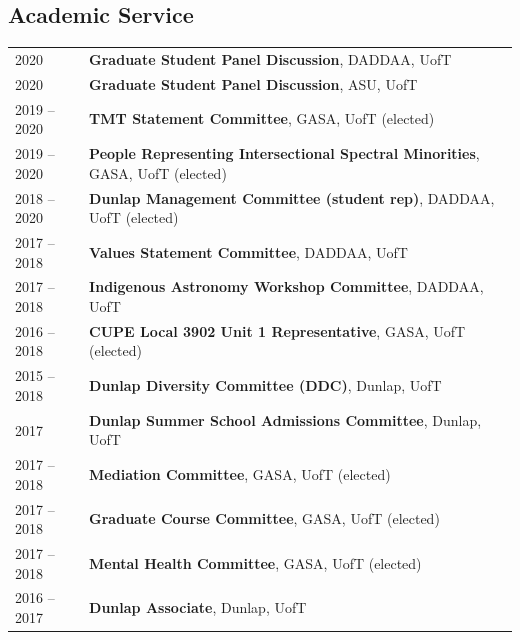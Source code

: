 \documentclass[10pt]{res} %
\begin{document}
\begin{resume}
\newpage
\section{\Large Academic Service}
\vspace{-5pt} %
\noindent\makebox[\linewidth]{\rule{\textwidth}{0.4pt}}
\vspace{-20pt} %

\begin{table}[h!]
\begin{tabularx}{\textwidth}{lX}
2020 & \textbf{Graduate Student Panel Discussion}, DADDAA, UofT \\
2020 & \textbf{Graduate Student Panel Discussion}, ASU, UofT \\
2019 -- 2020 & \textbf{TMT Statement Committee}, GASA, UofT (elected) \\
2019 -- 2020 & \textbf{People Representing Intersectional Spectral Minorities}, GASA, UofT (elected) \\
2018 -- 2020 & \textbf{Dunlap Management Committee (student rep)}, DADDAA, UofT (elected) \\
2017 -- 2018 & \textbf{Values Statement Committee}, DADDAA, UofT \\
2017 -- 2018 & \textbf{Indigenous Astronomy  Workshop Committee}, DADDAA, UofT \\
2016 --  2018 & \textbf{CUPE Local 3902 Unit 1 Representative}, GASA, UofT (elected) \\
2015 --  2018 & \textbf{Dunlap Diversity Committee (DDC)}, Dunlap, UofT \\
2017 & \textbf{Dunlap Summer School Admissions Committee}, Dunlap, UofT \\
2017 -- 2018 & \textbf{Mediation Committee}, GASA, UofT (elected) \\
2017 -- 2018 & \textbf{Graduate Course Committee}, GASA, UofT (elected) \\
2017 -- 2018 & \textbf{Mental Health Committee}, GASA, UofT (elected) \\
2016 --  2017 & \textbf{Dunlap Associate}, Dunlap, UofT
\end{tabularx}
\end{table}


\end{resume}
\end{document}

